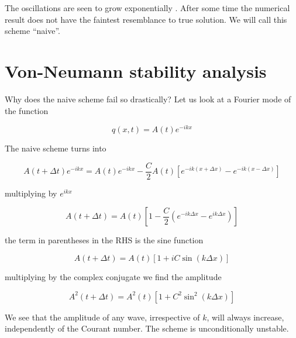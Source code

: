 The oscillations are seen to grow exponentially . After some time the
numerical result does not have the faintest resemblance to true
solution. We will call this scheme ``naive''. 

\section{Von-Neumann stability analysis}

Why does the naive scheme fail so drastically? Let us look at a Fourier mode of the function

\begin{equation}
q(x,t) = A(t) e^{-ikx}
\end{equation}


The naive scheme turns into

\begin{equation}
A(t+\Delta t)e^{-ikx} = A(t)e^{-ikx} - \frac{C}{2}A(t)\left[e^{-ik(x+\Delta x)} - e^{-ik(x-\Delta x)}\right]
\end{equation}

multiplying by $e^{ikx}$


\begin{equation}
A(t+\Delta t) = A(t) \left[ 1 - \frac{C}{2}\left(e^{-ik\Delta x} -  e^{ik\Delta x}\right)\right]
\end{equation}

the term in parentheses in the RHS is the sine function

  

\begin{equation}
A(t+\Delta t) = A(t)\left[1 + i C \sin \left(k\Delta x\right)\right]
\end{equation}

multiplying by the complex conjugate we find the amplitude

\begin{equation}
A^2(t+\Delta t) = A^2(t)\left[1 + C^2 \sin^2\left(k\Delta x\right)\right]
\end{equation}

We see that the amplitude of any wave, irrespective of $k$, will always increase, independently of the Courant number. The scheme is unconditionally unstable. 

